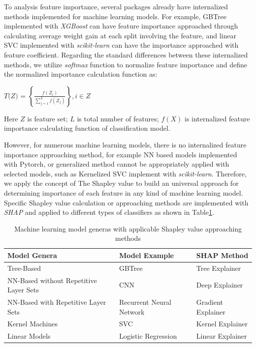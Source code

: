 \documentclass[fleqn,10pt]{wlscirep}
\begin{document}
To analysis feature importance, several packages already have internalized methods implemented for machine learning models.
For example, GBTree implemented with \emph{XGBoost}\cite{chen2016xgboost} can have feature importance approached through calculating average weight gain at each split involving the feature, and linear SVC implemented with \emph{scikit-learn}\cite{scikit-learn} can have the importance approached with feature coefficient.
Regarding the standard differences between these internalized methods, we utilize \emph{softmax} function to normalize feature importance and define the normalized importance calculation function as:

\centerline{$\textit{T(Z) = }\left\{\frac{f(Z_i)}{\sum_{j = 1}^{L} f(Z_j)}\right\}, i \in Z$}

\noindent Here $Z$ is feature set; $L$ is total number of features; $f(X)$ is internalized  feature importance calculating function of classification model.\

However, for numerous machine learning models, there is no internalized feature importance approaching method, for example NN based models implemented with Pytorch\cite{NEURIPS2019_9015}, or generalized method cannot be appropriately applied with selected models, such as Kernelized SVC implement with \emph{scikit-learn}\cite{scikit-learn}.
Therefore, we apply the concept of The Shapley value\cite{roth_1988} to build an universal approach for determining importance of each feature in any kind of machine learning model.
Specific Shapley value calculation or approaching methods are implemented with \emph{SHAP}\cite{lundberg2017unified} and applied to different types of classifiers as shown in Table\ref{shap}.

\begin{table}[ht]
\centering
\begin{tabular}{|l|l|l|}
\hline
\textbf{Model Genera} & \textbf{Model Example} & \textbf{SHAP\cite{lundberg2017unified} Method}  \\
\hline
Tree-Based & GBTree & Tree Explainer \\
\hline
NN-Based without Repetitive Layer Sets & CNN & Deep Explainer \\
\hline
NN-Based with Repetitive Layer Sets & Recurrent Neural Network & Gradient Explainer \\
\hline
Kernel Machines & SVC & Kernel Explainer \\
\hline
Linear Models & Logistic Regression & Linear Explainer \\
\hline
\end{tabular}
\caption{\label{shap}Machine learning model generas with applicable Shapley value approaching methods}
\end{table}
\end{document}
